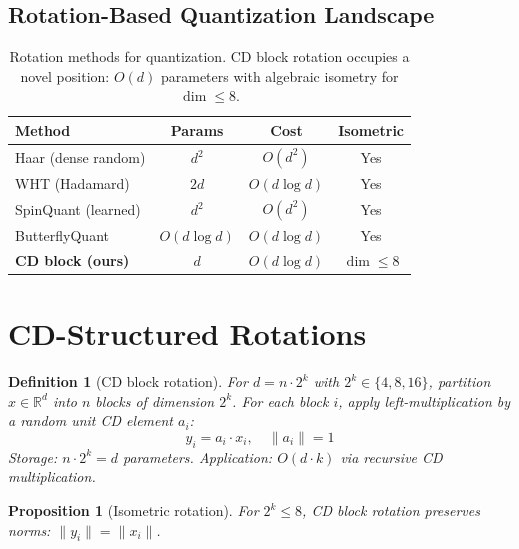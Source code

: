 \documentclass[sigconf,anonymous,review]{acmart}
\newtheorem{proposition}[theorem]{Proposition}
\newtheorem{definition}[theorem]{Definition}
\newcommand{\R}{\mathbb{R}}
\newcommand{\norm}[1]{\lVert #1 \rVert}
\begin{document}
\subsection{Rotation-Based Quantization Landscape}

\begin{table}[t]
\centering
\caption{Rotation methods for quantization. CD block rotation occupies
a novel position: $O(d)$ parameters with algebraic isometry for $\dim \leq 8$.}
\label{tab:rotations}
\begin{tabular}{lccc}
\toprule
Method & Params & Cost & Isometric \\
\midrule
Haar (dense random) & $d^2$ & $O(d^2)$ & Yes \\
WHT (Hadamard) & $2d$ & $O(d \log d)$ & Yes \\
SpinQuant (learned) & $d^2$ & $O(d^2)$ & Yes \\
ButterflyQuant & $O(d \log d)$ & $O(d \log d)$ & Yes \\
\textbf{CD block (ours)} & $d$ & $O(d \log d)$ & $\dim \leq 8$ \\
\bottomrule
\end{tabular}
\end{table}

\section{CD-Structured Rotations}
\label{sec:cd-rotation}

\begin{definition}[CD block rotation]
\label{def:cd-block}
For $d = n \cdot 2^k$ with $2^k \in \{4, 8, 16\}$, partition
$x \in \R^d$ into $n$ blocks of dimension $2^k$. For each block $i$,
apply left-multiplication by a random unit CD element $a_i$:
\begin{equation}
  y_i = a_i \cdot x_i, \quad \norm{a_i} = 1
  \label{eq:cd-rotation}
\end{equation}
Storage: $n \cdot 2^k = d$ parameters. Application: $O(d \cdot k)$
via recursive CD multiplication.
\end{definition}

\begin{proposition}[Isometric rotation]
\label{prop:isometry}
For $2^k \leq 8$, CD block rotation preserves norms:
$\norm{y_i} = \norm{x_i}$.
\end{proposition}
\end{document}

